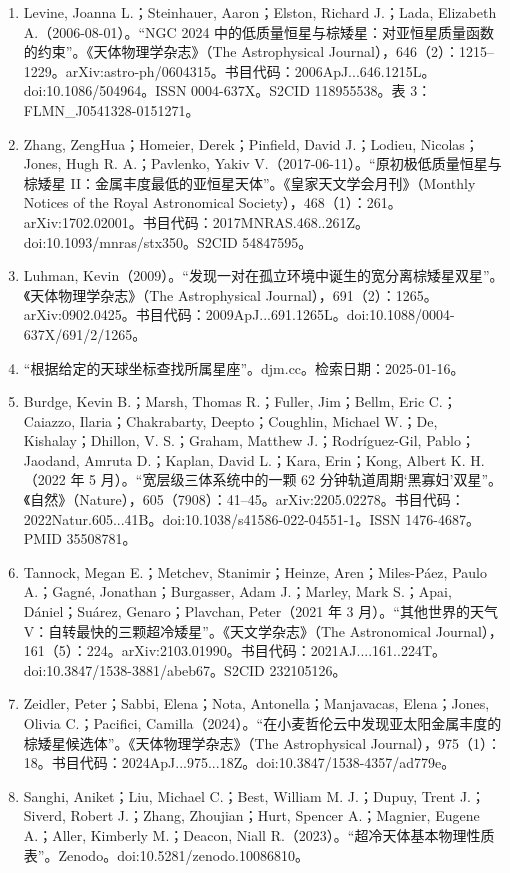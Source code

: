 \begin{enumerate}
\item Levine, Joanna L.；Steinhauer, Aaron；Elston, Richard J.；Lada, Elizabeth A.（2006-08-01）。“NGC 2024 中的低质量恒星与棕矮星：对亚恒星质量函数的约束”。《天体物理学杂志》（The Astrophysical Journal），646（2）：1215–1229。arXiv:astro-ph/0604315。书目代码：2006ApJ...646.1215L。doi:10.1086/504964。ISSN 0004-637X。S2CID 118955538。表 3：FLMN_J0541328-0151271。
\item Zhang, ZengHua；Homeier, Derek；Pinfield, David J.；Lodieu, Nicolas；Jones, Hugh R. A.；Pavlenko, Yakiv V.（2017-06-11）。“原初极低质量恒星与棕矮星 II：金属丰度最低的亚恒星天体”。《皇家天文学会月刊》（Monthly Notices of the Royal Astronomical Society），468（1）：261。arXiv:1702.02001。书目代码：2017MNRAS.468..261Z。doi:10.1093/mnras/stx350。S2CID 54847595。
\item Luhman, Kevin（2009）。“发现一对在孤立环境中诞生的宽分离棕矮星双星”。《天体物理学杂志》（The Astrophysical Journal），691（2）：1265。arXiv:0902.0425。书目代码：2009ApJ...691.1265L。doi:10.1088/0004-637X/691/2/1265。
\item “根据给定的天球坐标查找所属星座”。djm.cc。检索日期：2025-01-16。
\item Burdge, Kevin B.；Marsh, Thomas R.；Fuller, Jim；Bellm, Eric C.；Caiazzo, Ilaria；Chakrabarty, Deepto；Coughlin, Michael W.；De, Kishalay；Dhillon, V. S.；Graham, Matthew J.；Rodríguez-Gil, Pablo；Jaodand, Amruta D.；Kaplan, David L.；Kara, Erin；Kong, Albert K. H.（2022 年 5 月）。“宽层级三体系统中的一颗 62 分钟轨道周期‘黑寡妇’双星”。《自然》（Nature），605（7908）：41–45。arXiv:2205.02278。书目代码：2022Natur.605...41B。doi:10.1038/s41586-022-04551-1。ISSN 1476-4687。PMID 35508781。
\item Tannock, Megan E.；Metchev, Stanimir；Heinze, Aren；Miles-Páez, Paulo A.；Gagné, Jonathan；Burgasser, Adam J.；Marley, Mark S.；Apai, Dániel；Suárez, Genaro；Plavchan, Peter（2021 年 3 月）。“其他世界的天气 V：自转最快的三颗超冷矮星”。《天文学杂志》（The Astronomical Journal），161（5）：224。arXiv:2103.01990。书目代码：2021AJ....161..224T。doi:10.3847/1538-3881/abeb67。S2CID 232105126。
\item Zeidler, Peter；Sabbi, Elena；Nota, Antonella；Manjavacas, Elena；Jones, Olivia C.；Pacifici, Camilla（2024）。“在小麦哲伦云中发现亚太阳金属丰度的棕矮星候选体”。《天体物理学杂志》（The Astrophysical Journal），975（1）：18。书目代码：2024ApJ...975...18Z。doi:10.3847/1538-4357/ad779e。
\item Sanghi, Aniket；Liu, Michael C.；Best, William M. J.；Dupuy, Trent J.；Siverd, Robert J.；Zhang, Zhoujian；Hurt, Spencer A.；Magnier, Eugene A.；Aller, Kimberly M.；Deacon, Niall R.（2023）。“超冷天体基本物理性质表”。Zenodo。doi:10.5281/zenodo.10086810。

\end{enumerate}
